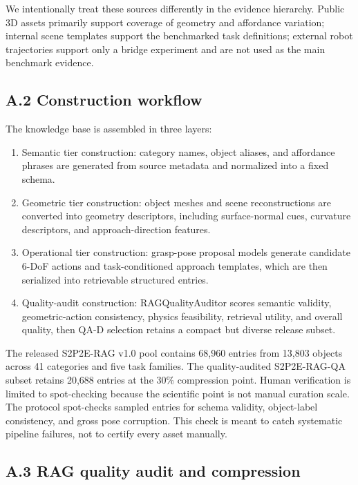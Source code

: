 \documentclass[11pt]{article}
\begin{document}
We intentionally treat these sources differently in the evidence hierarchy. Public 3D assets primarily support coverage of geometry and affordance variation; internal scene templates support the benchmarked task definitions; external robot trajectories support only a bridge experiment and are not used as the main benchmark evidence.

\subsection{A.2 Construction workflow}

The knowledge base is assembled in three layers:

\begin{enumerate}[leftmargin=1.5em]
\item Semantic tier construction: category names, object aliases, and affordance phrases are generated from source metadata and normalized into a fixed schema.
\item Geometric tier construction: object meshes and scene reconstructions are converted into geometry descriptors, including surface-normal cues, curvature descriptors, and approach-direction features.
\item Operational tier construction: grasp-pose proposal models generate candidate 6-DoF actions and task-conditioned approach templates, which are then serialized into retrievable structured entries.
\item Quality-audit construction: RAGQualityAuditor scores semantic validity, geometric-action consistency, physics feasibility, retrieval utility, and overall quality, then QA-D selection retains a compact but diverse release subset.
\end{enumerate}

The released S2P2E-RAG v1.0 pool contains 68,960 entries from 13,803 objects across 41 categories and five task families. The quality-audited S2P2E-RAG-QA subset retains 20,688 entries at the 30\% compression point. Human verification is limited to spot-checking because the scientific point is not manual curation scale. The protocol spot-checks sampled entries for schema validity, object-label consistency, and gross pose corruption. This check is meant to catch systematic pipeline failures, not to certify every asset manually.

\subsection{A.3 RAG quality audit and compression}
\end{document}
